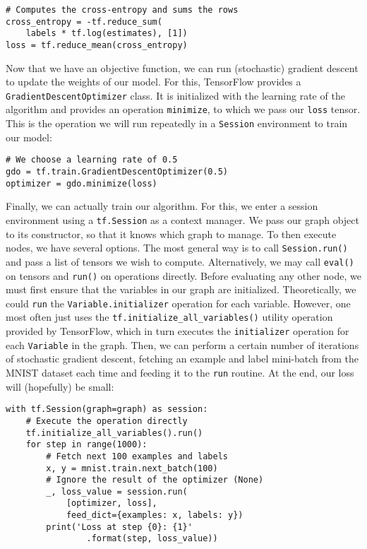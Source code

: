 \begin{lstlisting}
# Computes the cross-entropy and sums the rows
cross_entropy = -tf.reduce_sum(
    labels * tf.log(estimates), [1])
loss = tf.reduce_mean(cross_entropy)
\end{lstlisting}

Now that we have an objective function, we can run (stochastic) gradient descent
to update the weights of our model. For this, TensorFlow provides a
\texttt{GradientDescentOptimizer} class. It is initialized with the
learning rate of the algorithm and provides an operation \texttt{minimize}, to
which we pass our \texttt{loss} tensor. This is the operation we will run
repeatedly in a \texttt{Session} environment to train our model:

\begin{lstlisting}
# We choose a learning rate of 0.5
gdo = tf.train.GradientDescentOptimizer(0.5)
optimizer = gdo.minimize(loss)
\end{lstlisting}

Finally, we can actually train our algorithm. For this, we enter a session
environment using a \texttt{tf.Session} as a context manager. We pass our graph
object to its constructor, so that it knows which graph to manage. To then
execute nodes, we have several options. The most general way is to call
\texttt{Session.run()} and pass a list of tensors we wish to
compute. Alternatively, we may call \texttt{eval()} on tensors and
\texttt{run()} on operations directly. Before evaluating any other node, we must
first ensure that the variables in our graph are initialized. Theoretically, we
could \texttt{run} the \texttt{Variable.initializer} operation for each
variable. However, one most often just uses the
\texttt{tf.initialize\_all\_variables()} utility operation provided by
TensorFlow, which in turn executes the \texttt{initializer} operation for each
\texttt{Variable} in the graph. Then, we can perform a certain number of
iterations of stochastic gradient descent, fetching an example and label
mini-batch from the MNIST dataset each time and feeding it to the \texttt{run}
routine. At the end, our loss will (hopefully) be small:

\begin{lstlisting}
with tf.Session(graph=graph) as session:
    # Execute the operation directly
    tf.initialize_all_variables().run()
    for step in range(1000):
        # Fetch next 100 examples and labels
        x, y = mnist.train.next_batch(100)
        # Ignore the result of the optimizer (None)
        _, loss_value = session.run(
            [optimizer, loss],
            feed_dict={examples: x, labels: y})
        print('Loss at step {0}: {1}'
                .format(step, loss_value))
\end{lstlisting}

